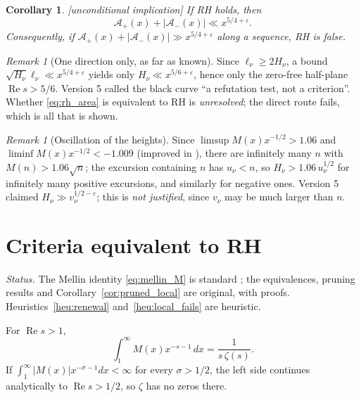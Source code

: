 \documentclass[11pt]{amsart}
\numberwithin{equation}{section}
\theoremstyle{plain}
\newtheorem{corollary}[theorem]{Corollary}
\theoremstyle{definition}
\theoremstyle{remark}
\newtheorem{remark}[theorem]{Remark}
\newcommand{\Ap}{\mathcal{A}_{+}}
\newcommand{\Am}{\mathcal{A}_{-}}
\newcommand{\eps}{\varepsilon}
\begin{document}
\begin{corollary}
\label{cor:rh}
\emph{[unconditional implication]} If RH holds, then
\begin{equation}
\label{eq:rh_area}
  \Ap(x)+|\Am(x)|\ll x^{5/4+\eps}.
\end{equation}
Consequently, if $\Ap(x)+|\Am(x)|\gg x^{5/4+\eps}$ along a sequence, RH is
false.
\end{corollary}

\begin{remark}[One direction only, as far as known]
\label{rem:onedirection}
Since $\ell_\nu\ge2H_\nu$, a bound $\sqrt{H_\nu}\ell_\nu\ll x^{5/4+\eps}$
yields only $H_\nu\ll x^{5/6+\eps}$, hence only the zero-free half-plane
$\operatorname{Re}s>5/6$. Version 5 called the black curve ``a refutation
test, not a criterion''. Whether \eqref{eq:rh_area} is equivalent to RH is
\emph{unresolved}; the direct route fails, which is all that is shown.
\end{remark}

\begin{remark}[Oscillation of the heights]
\label{rem:omega}
Since $\limsup M(x)x^{-1/2}>1.06$ and $\liminf M(x)x^{-1/2}<-1.009$
\cite{OdlyzkoTeRiele1985} (improved in \cite{KotnikTeRiele2006}), there are
infinitely many $n$ with $M(n)>1.06\sqrt n$; the excursion containing $n$
has $u_\nu<n$, so $H_\nu>1.06\,u_\nu^{1/2}$ for infinitely many positive
excursions, and similarly for negative ones. Version 5 claimed
$H_\nu\gg v_\nu^{1/2-\eps}$; this is \emph{not justified}, since $v_\nu$
may be much larger than $n$.
\end{remark}

\section{Criteria equivalent to RH}
\label{sec:criteria}

\noindent\emph{Status.} The Mellin identity \eqref{eq:mellin_M} is standard
\cite{MontgomeryVaughan2007}; the equivalences, pruning results and
Corollary~\ref{cor:pruned_local} are original, with proofs.
Heuristics~\ref{heu:renewal} and~\ref{heu:local_fails} are heuristic.

\medskip

For $\operatorname{Re}s>1$,
\begin{equation}
\label{eq:mellin_M}
  \int_1^\infty M(x)x^{-s-1}\,dx=\frac{1}{s\,\zeta(s)} .
\end{equation}
If $\int_1^\infty|M(x)|x^{-\sigma-1}dx<\infty$ for every $\sigma>1/2$, the
left side continues analytically to $\operatorname{Re}s>1/2$, so $\zeta$ has
no zeros there.
\end{document}

